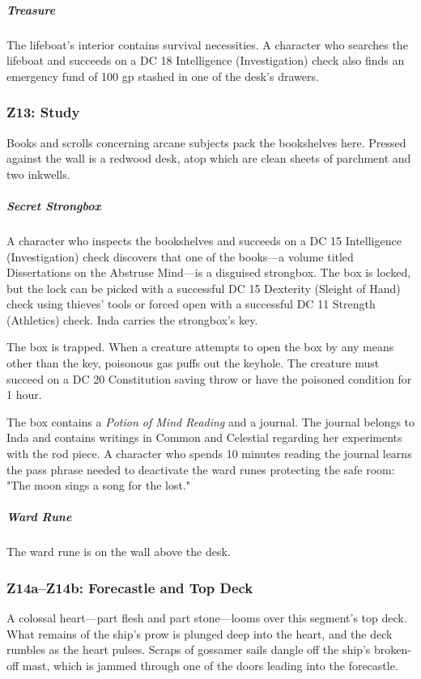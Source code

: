\documentclass[10pt,a4paper,twoside,bg=print,twocolumn,openany,nodeprecatedcode]{dndbook}
\begin{document}
\subparagraph{Treasure}
The lifeboat's interior contains survival necessities. A character who searches the lifeboat and succeeds on a DC 18 Intelligence (Investigation) check also finds an emergency fund of 100 gp stashed in one of the desk's drawers.

\subsubsection{Z13: Study}
\begin{DndReadAloud}{}
Books and scrolls concerning arcane subjects pack the bookshelves here. Pressed against the wall is a redwood desk, atop which are clean sheets of parchment and two inkwells.

\end{DndReadAloud}

\subparagraph{Secret Strongbox}
A character who inspects the bookshelves and succeeds on a DC 15 Intelligence (Investigation) check discovers that one of the books—a volume titled Dissertations on the Abstruse Mind—is a disguised strongbox. The box is locked, but the lock can be picked with a successful DC 15 Dexterity (Sleight of Hand) check using thieves' tools or forced open with a successful DC 11 Strength (Athletics) check. Inda carries the strongbox's key.

The box is trapped. When a creature attempts to open the box by any means other than the key, poisonous gas puffs out the keyhole. The creature must succeed on a DC 20 Constitution saving throw or have the poisoned condition for 1 hour.

The box contains a \textit{Potion of Mind Reading} and a journal. The journal belongs to Inda and contains writings in Common and Celestial regarding her experiments with the rod piece. A character who spends 10 minutes reading the journal learns the pass phrase needed to deactivate the ward runes protecting the safe room: "The moon sings a song for the lost."

\subparagraph{Ward Rune}
The ward rune is on the wall above the desk.

\subsubsection{Z14a–Z14b: Forecastle and Top Deck}
\begin{DndReadAloud}{}
A colossal heart—part flesh and part stone—looms over this segment's top deck. What remains of the ship's prow is plunged deep into the heart, and the deck rumbles as the heart pulses. Scraps of gossamer sails dangle off the ship's broken-off mast, which is jammed through one of the doors leading into the forecastle.

\end{DndReadAloud}
\end{document}
